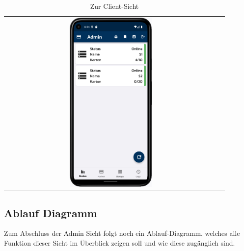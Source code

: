 \vspace{1cm}
\begin{table}[htbp]
  \centering
  \begin{tabular}{cc}
    \includegraphics[width=0.4\textwidth]{FLUTTER/images/ZB/status_page.png} \\
  \end{tabular}
  \label{tab:example}
  \captionsetup{type=figure}
  \caption{Zur Client-Sicht}
\end{table}

\newpage

\subsection{Ablauf Diagramm}
Zum Abschluss der Admin Sicht folgt noch ein Ablauf-Diagramm, welches alle Funktion dieser Sicht im Überblick zeigen soll und wie diese zugänglich sind.


